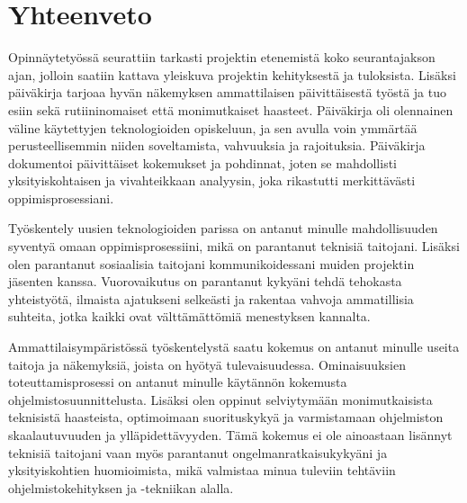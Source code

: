 \documentclass[11pt,a4paper,titlepage,oneside]{article}
\begin{document}
\newpage
{} %










\newpage
\section{Yhteenveto}             %



%




Opinnäytetyössä seurattiin tarkasti projektin etenemistä koko seurantajakson ajan,
jolloin saatiin kattava yleiskuva projektin kehityksestä ja tuloksista.
Lisäksi päiväkirja tarjoaa hyvän näkemyksen ammattilaisen päivittäisestä työstä ja tuo esiin sekä rutiininomaiset että monimutkaiset haasteet. 
Päiväkirja oli olennainen väline käytettyjen teknologioiden opiskeluun,
ja sen avulla voin ymmärtää perusteellisemmin niiden soveltamista, vahvuuksia ja rajoituksia. 
Päiväkirja dokumentoi päivittäiset kokemukset ja pohdinnat,
joten se mahdollisti yksityiskohtaisen ja vivahteikkaan analyysin, joka rikastutti merkittävästi oppimisprosessiani.
\medskip





Työskentely uusien teknologioiden parissa on antanut minulle mahdollisuuden syventyä omaan oppimisprosessiini, 
mikä on parantanut teknisiä taitojani.
Lisäksi olen parantanut sosiaalisia taitojani kommunikoidessani muiden projektin jäsenten kanssa.
Vuorovaikutus on parantanut kykyäni tehdä tehokasta yhteistyötä,
ilmaista ajatukseni selkeästi ja rakentaa vahvoja ammatillisia suhteita,
jotka kaikki ovat välttämättömiä menestyksen kannalta. \\
\medskip



Ammattilaisympäristössä työskentelystä saatu kokemus on antanut minulle useita taitoja ja näkemyksiä, 
joista on hyötyä tulevaisuudessa.
Ominaisuuksien toteuttamisprosessi on antanut minulle käytännön kokemusta ohjelmistosuunnittelusta. 
Lisäksi olen oppinut selviytymään monimutkaisista teknisistä haasteista,
optimoimaan suorituskykyä ja varmistamaan ohjelmiston skaalautuvuuden ja ylläpidettävyyden.
Tämä kokemus ei ole ainoastaan lisännyt teknisiä taitojani vaan myös parantanut ongelmanratkaisukykyäni ja yksityiskohtien huomioimista, 
mikä valmistaa minua tuleviin tehtäviin ohjelmistokehityksen ja -tekniikan alalla.
\end{document}

